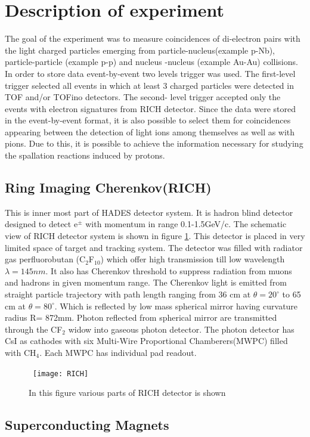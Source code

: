 \section{Description of experiment}
The goal of the experiment was to measure coincidences of di-electron pairs with the light charged particles emerging from particle-nucleus(example p-Nb), particle-particle (example p-p) and nucleus -nucleus (example Au-Au) collisions.  In order to store data event-by-event  two levels  trigger was used. The first-level trigger selected all events in which at least 3 charged particles were detected in TOF and/or TOFino detectors.  The second- level trigger accepted only the events with electron signatures from RICH detector.   Since the data were stored in the event-by-event format, it is also possible to select them for coincidences appearing between the detection of light ions  among themselves as well as with pions.  Due to this, it is possible to achieve the information necessary for studying the spallation reactions induced by protons. 

\subsection{Ring Imaging Cherenkov(RICH)}
This is inner most part of HADES detector system. It is hadron blind detector designed to detect e$^\pm$  with momentum in range  0.1-1.5GeV/c. The schematic view of RICH detector system is shown in figure \ref{RICH}. This detector is placed in very limited space of target and tracking system. The detector was filled with radiator gas perfluorobutan (C$_2$F$_10$) which offer high transmission till low wavelength $\lambda= 145nm$. It also has Cherenkov threshold to suppress radiation from muons and hadrons in given momentum range. The Cherenkov light is emitted from straight particle trajectory with path length ranging from 36 cm at $\theta=20^\circ$ to 65 cm at $\theta=80^\circ$. Which is reflected by low mass spherical mirror having curvature radius R= 872mm. Photon reflected from spherical mirror are transmitted through the  CF$_2$ widow into gaseous photon detector. The photon detector has CsI as cathodes with six Multi-Wire Proportional Chamberers(MWPC) filled with CH$_4$. Each MWPC has individual pad readout.
\begin{figure}
	\centering\
	\texttt{[image: RICH]}
	\caption{In this figure various parts of RICH detector is shown }
	\label{RICH}
\end{figure}
\subsection{Superconducting Magnets}


